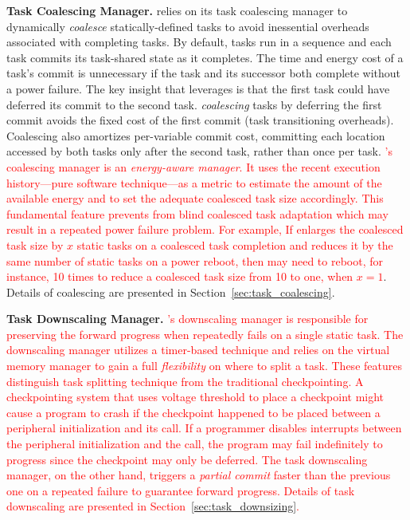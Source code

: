 \textbf{\sys Task Coalescing Manager.} \sys relies on its task coalescing manager to dynamically {\em coalesce} statically\hyp{}defined tasks to avoid inessential overheads associated with completing tasks. By default, tasks run in a sequence and each task commits its task-shared state as it completes.  The time and energy cost of a task's commit is unnecessary if the task and its successor both complete without a power failure. The key insight that \sys leverages is that the first task could have deferred its commit to the second task. {\em coalescing} tasks by deferring the first commit avoids the fixed cost of the first commit (task transitioning overheads). Coalescing also amortizes per-variable commit cost, committing each location accessed by both tasks only after the second task, rather than once per task. \textcolor{red}{\sys's coalescing manager is an \emph{energy-aware manager}. It uses the recent execution history---pure software technique---as a metric to estimate the amount of the available energy and to set the adequate coalesced task size accordingly. This fundamental feature prevents \sys from blind coalesced task adaptation which may result in a repeated power failure problem. For example, If \sys enlarges the coalesced task size by $x$ static tasks on a coalesced task completion and reduces it by the same number of static tasks on a power reboot, then \sys may need to reboot, for instance, 10 times to reduce a coalesced task size from 10 to one, when $x=1$}. Details of coalescing are presented in Section~\ref{sec:task_coalescing}.

\textbf{\sys Task Downscaling Manager.} \textcolor{red}{\sys's downscaling manager is responsible for preserving the forward progress when \sys repeatedly fails on a single static task. The downscaling manager utilizes a timer-based technique and relies on the virtual memory manager to gain a full \emph{flexibility} on where to split a task. These features distinguish \sys task splitting technique from the traditional checkpointing. A checkpointing system that uses voltage threshold to place a checkpoint might cause a program to crash if the checkpoint happened to be placed between a peripheral initialization and its call. If a programmer disables interrupts between the peripheral initialization and the call, the program may fail indefinitely to progress since the checkpoint may only be deferred. The \sys task downscaling manager, on the other hand,  triggers  a \emph{partial commit} faster than the previous one on a repeated failure to guarantee forward progress. Details of task downscaling are presented in Section~\ref{sec:task_downsizing}.} 


